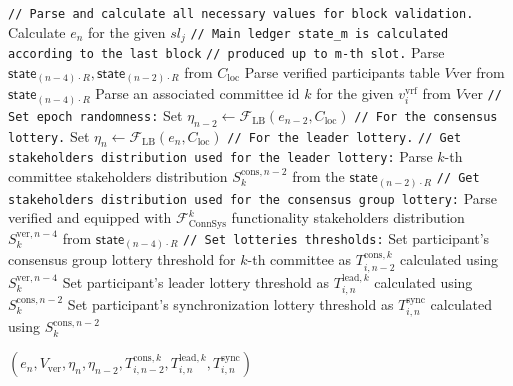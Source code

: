 \begin{algorithm}[ht]
    \begin{algorithmic}[1]
        \caption{$\textsf{PrepareForBlockValidation}(sl_j, v_i^{\text{vrf}}, C_{\text{loc}})$}
        \State \lstinline|// Parse and calculate all necessary values for block validation.|
        \State Calculate $e_n$ for the given $sl_j$
        \State \lstinline|// Main ledger state_m is calculated according to the last block|
        \State \lstinline|// produced up to m-th slot.|
        \State Parse $\textsf{state}_{(n - 4)\cdot R},
        \textsf{state}_{(n - 2)\cdot R}$ from $C_{\text{loc}}$
        \State Parse verified participants table $V{\text{ver}}$ from $\textsf{state}_{(n - 4)\cdot R}$
        \State Parse an associated committee id $k$ for the given $v_i^{\text{vrf}}$ from $V{\text{ver}}$
        \State \lstinline|// Set epoch randomness:|
        \State Set ${\eta_{n-2} \leftarrow \mathcal{F}_{\text{LB}}(e_{n-2}, C_{\text{loc}})}$ \lstinline|// For the consensus lottery.|
        \State Set ${\eta_{n} \leftarrow \mathcal{F}_{\text{LB}}(e_{n}, C_{\text{loc}})}$ \lstinline|// For the leader lottery.|
        \State \lstinline|// Get stakeholders distribution used for the leader lottery:|
        \State Parse $k$-th committee stakeholders distribution $S_k^{\text{cons}, n - 2}$ from the $\textsf{state}_{(n - 2)\cdot R}$
        \State \lstinline|// Get stakeholders distribution used for the consensus group lottery:|
        \State Parse verified and equipped with $\mathcal{F}^k_{\text{ConnSys}}$ functionality stakeholders distribution $S_k^{\text{ver}, {n - 4}}$
        from $\textsf{state}_{(n - 4)\cdot R}$
        \State \lstinline|// Set lotteries thresholds:|
        \State Set participant's consensus group lottery threshold for $k$-th committee as $T_{i, n-2}^{\text{cons}, k}$ calculated using $S_k^{\text{ver}, {n - 4}}$
        \State Set participant's leader lottery threshold as $T_{i, n}^{\text{lead}, k}$ calculated using $S_k^{\text{cons}, {n - 2}}$
        \State Set participant's synchronization lottery threshold as $T_{i, n}^{\text{sync}}$ calculated using $S_k^{\text{cons}, {n - 2}}$

        \Return ${(e_n, V_{\text{ver}}, \eta_{n}, \eta_{n - 2}, T_{i, n-2}^{\text{cons}, k}, T_{i, n}^{\text{lead}, k}, T_{i, n}^{\text{sync}})}$
    \end{algorithmic}\label{alg:algorithm-2.0}
\end{algorithm}

